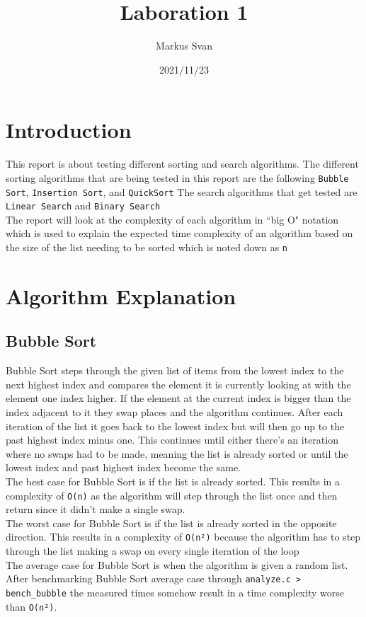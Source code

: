 \documentclass{article}
\title{Laboration 1}
\author{Markus Svan}
\date{2021/11/23}
\begin{document}
    \maketitle
    \newpage
    \tableofcontents
    \newpage
    \section{Introduction}
    This report is about testing different sorting and search algorithms. The different sorting algorithms that are being tested in this report are the following \texttt{Bubble Sort}, \texttt{Insertion Sort}, and \texttt{QuickSort}
    The search algorithms that get tested are \texttt{Linear Search} and \texttt{Binary Search}\\
    The report will look at the complexity of each algorithm in ``big O" notation which is used to explain the expected time complexity of an algorithm based on the size of the list needing to be sorted which is noted down as \texttt{n}
    \section{Algorithm Explanation}
    \subsection{Bubble Sort}
    Bubble Sort steps through the given list of items from the lowest index to the next highest index and compares the element it is currently looking at with the element one index higher.
    If the element at the current index is bigger than the index adjacent to it they swap places and the algorithm continues.
    After each iteration of the list it goes back to the lowest index but will then go up to the past highest index minus one.
    This continues until either there's an iteration where no swaps had to be made, meaning the list is already sorted or until the lowest index and past highest index become the same.\\
    The best case for Bubble Sort is if the list is already sorted. This results in a complexity of \texttt{O(n)} as the algorithm will step through the list once and then return since it didn't make a single swap.\\
    The worst case for Bubble Sort is if the list is already sorted in the opposite direction. This results in a complexity of \texttt{O(n²)} because the algorithm has to step through the list making a swap on every single iteration of the loop\\
    The average case for Bubble Sort is when the algorithm is given a random list. After benchmarking Bubble Sort average case through \texttt{analyze.c > bench\_bubble} the measured times somehow result in a time complexity worse than \texttt{O(n²)}.
\end{document}
